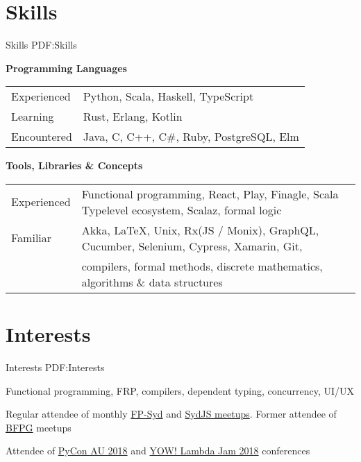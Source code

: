 \documentclass[a4paper,10pt,oneside]{article}
\begin{document}
\begin{minipage}[t][0pt]{\linewidth}
\begin{body}

\section
{Skills}
{Skills}
{PDF:Skills}

\textbf{Programming Languages}
\par
\begin{tabular}{ll}
\par Experienced & Python, Scala, Haskell, TypeScript\\
\par Learning & Rust, Erlang, Kotlin\\
\par Encountered & Java, C, C++, C\#, Ruby, PostgreSQL, Elm
\end{tabular}

\EntryGap
\EntryGap

\textbf{Tools, Libraries \& Concepts}

\par
\begin{tabular}{ll}
\par Experienced & Functional programming, React, Play, Finagle, Scala Typelevel ecosystem, Scalaz, formal logic\\
\par Familiar & Akka, \LaTeX, Unix, Rx(JS / Monix), GraphQL, Cucumber, Selenium, Cypress, Xamarin, Git,\\
& compilers, formal methods, discrete mathematics, algorithms \& data structures\\
\end{tabular}

\EntryGap

\section
{Interests}
{Interests}
{PDF:Interests}

\par Functional programming, FRP, compilers, dependent typing, concurrency, UI/UX
\par Regular attendee of monthly \href{https://www.meetup.com/en-AU/FP-Syd/}{FP-Syd} and \href{https://www.sydjs.com/}{SydJS meetups}. Former attendee of \href{https://www.meetup.com/en-AU/Brisbane-Functional-Programming-Group/}{BFPG} meetups
\par Attendee of \href{https://2018.pycon-au.org/}{PyCon AU 2018} and \href{http://lambdajam.yowconference.com.au/}
{YOW! Lambda Jam 2018} conferences



\end{body}
\end{minipage}
\end{document}
